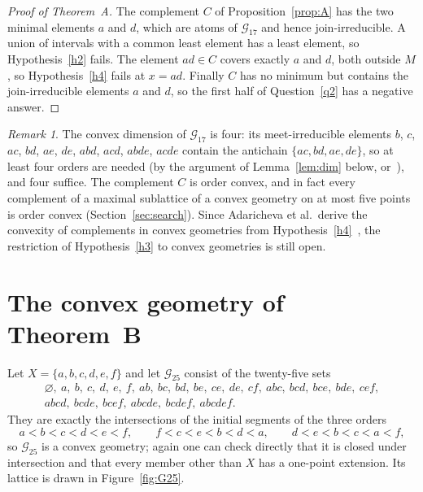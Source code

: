 \documentclass[11pt]{amsart}
\theoremstyle{definition}
\theoremstyle{remark}
\newtheorem{remark}[theorem]{Remark}
\numberwithin{equation}{section}
\begin{document}
\begin{proof}[Proof of Theorem~A]
The complement $C$ of Proposition~\ref{prop:A} has the two minimal elements $a$ and $d$, which are atoms of $\mathcal G_{17}$ and hence join-irreducible. A union of intervals with a common least element has a least element, so Hypothesis~\ref{h2} fails. The element $ad\in C$ covers exactly $a$ and $d$, both outside $M$, so Hypothesis~\ref{h4} fails at $x=ad$. Finally $C$ has no minimum but contains the join-irreducible elements $a$ and $d$, so the first half of Question~\ref{q2} has a negative answer.
\end{proof}

\begin{remark}
The convex dimension of $\mathcal G_{17}$ is four: its meet-irreducible elements $b$, $c$, $ac$, $bd$, $ae$, $de$, $abd$, $acd$, $abde$, $acde$ contain the antichain $\{ac,bd,ae,de\}$, so at least four orders are needed (by the argument of Lemma~\ref{lem:dim} below, or~\cite{EJ}), and four suffice. The complement $C$ is order convex, and in fact every complement of a maximal sublattice of a convex geometry on at most five points is order convex (Section~\ref{sec:search}). Since Adaricheva et al.\ derive the convexity of complements in convex geometries from Hypothesis~\ref{h4}~\cite[Lemma~6.7]{AMSZ}, the restriction of Hypothesis~\ref{h3} to convex geometries is still open.
\end{remark}

\section{The convex geometry of Theorem~B}\label{sec:B}

Let $X=\{a,b,c,d,e,f\}$ and let $\mathcal G_{25}$ consist of the twenty-five sets
\begin{equation}\label{eq:G25}
\begin{gathered}
\varnothing,\ a,\ b,\ c,\ d,\ e,\ f,\ ab,\ bc,\ bd,\ be,\ ce,\ de,\ cf,\ abc,\ bcd,\ bce,\ bde,\ cef,\\ abcd,\ bcde,\ bcef,\ abcde,\ bcdef,\ abcdef.
\end{gathered}
\end{equation}
They are exactly the intersections of the initial segments of the three orders
\begin{equation}\label{eq:orders25}
a<b<c<d<e<f,\qquad f<c<e<b<d<a,\qquad d<e<b<c<a<f,
\end{equation}
so $\mathcal G_{25}$ is a convex geometry; again one can check directly that it is closed under intersection and that every member other than $X$ has a one-point extension. Its lattice is drawn in Figure~\ref{fig:G25}.
\end{document}
